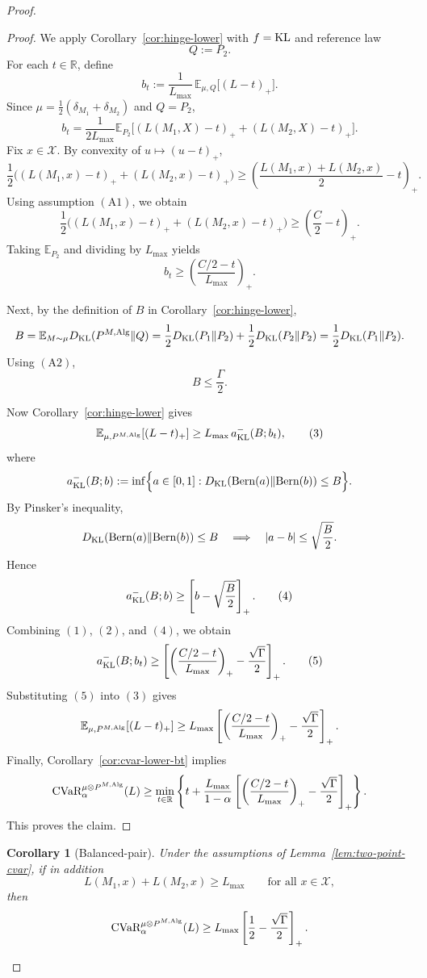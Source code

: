 \documentclass[conference]{IEEEtran}
\newtheorem{corollary}{Corollary}
\begin{document}
\begin{proof}[Proof]
\begin{proof}
We apply Corollary~\ref{cor:hinge-lower} with \(f=\textup{KL}\) and reference law
\[
Q:=P_2.
\]
For each \(t\in\mathbb{R}\), define
\[
b_t:=\frac{1}{L_{\max}}\,
\mathbb{E}_{\mu,Q}\big[(L-t)_+\big].
\]
Since \(\mu=\frac12(\delta_{M_1}+\delta_{M_2})\) and \(Q=P_2\),
\[
b_t
=
\frac{1}{2L_{\max}}
\mathbb{E}_{P_2}\big[(L(M_1,X)-t)_+ + (L(M_2,X)-t)_+\big].
\]
Fix \(x\in\mathcal{X}\). By convexity of \(u\mapsto (u-t)_+\),
\[
\frac12\Big((L(M_1,x)-t)_+ + (L(M_2,x)-t)_+\Big)
\ge
\left(\frac{L(M_1,x)+L(M_2,x)}{2}-t\right)_+.
\]
Using assumption \((\mathrm{A1})\), we obtain
\[
\frac12\Big((L(M_1,x)-t)_+ + (L(M_2,x)-t)_+\Big)
\ge
\left(\frac{C}{2}-t\right)_+.
\]
Taking \(\mathbb{E}_{P_2}\) and dividing by \(L_{\max}\) yields
\[
b_t\ge \left(\frac{C/2-t}{L_{\max}}\right)_+.
\tag{1}
\]

Next, by the definition of \(B\) in Corollary~\ref{cor:hinge-lower},
\[
B
=
\mathbb{E}_{M\sim\mu}D_{\textup{KL}}(P^{M,\textup{Alg}}\|Q)
=
\frac12D_{\textup{KL}}(P_1\|P_2)+\frac12D_{\textup{KL}}(P_2\|P_2)
=
\frac12D_{\textup{KL}}(P_1\|P_2).
\]
Using \((\mathrm{A2})\),
\[
B\le \frac{\Gamma}{2}.
\tag{2}
\]

Now Corollary~\ref{cor:hinge-lower} gives
\[
\mathbb{E}_{\mu,P^{M,\textup{Alg}}}[(L-t)_+]
\ge
L_{\max}\,a^{-}_{\textup{KL}}(B;b_t),
\tag{3}
\]
where
\[
a^{-}_{\textup{KL}}(B;b)
:=
\inf\Bigl\{a\in[0,1]:
D_{\textup{KL}}(\textup{Bern}(a)\|\textup{Bern}(b))\le B
\Bigr\}.
\]
By Pinsker's inequality,
\[
D_{\textup{KL}}(\textup{Bern}(a)\|\textup{Bern}(b))\le B
\quad\Longrightarrow\quad
|a-b|\le \sqrt{\frac{B}{2}}.
\]
Hence
\[
a^{-}_{\textup{KL}}(B;b)\ge \left[b-\sqrt{\frac{B}{2}}\right]_+.
\tag{4}
\]
Combining \((1)\), \((2)\), and \((4)\), we obtain
\[
a^{-}_{\textup{KL}}(B;b_t)
\ge
\left[
\left(\frac{C/2-t}{L_{\max}}\right)_+
-\frac{\sqrt{\Gamma}}{2}
\right]_+.
\tag{5}
\]
Substituting \((5)\) into \((3)\) gives
\[
\mathbb{E}_{\mu,P^{M,\textup{Alg}}}[(L-t)_+]
\ge
L_{\max}
\left[
\left(\frac{C/2-t}{L_{\max}}\right)_+
-\frac{\sqrt{\Gamma}}{2}
\right]_+.
\]
Finally, Corollary~\ref{cor:cvar-lower-bt} implies
\[
\textup{CVaR}_\alpha^{\mu\otimes P^{M,\textup{Alg}}}(L)
\ge
\min_{t\in\mathbb{R}}
\left\{
t+\frac{L_{\max}}{1-\alpha}
\left[
\left(\frac{C/2-t}{L_{\max}}\right)_+
-\frac{\sqrt{\Gamma}}{2}
\right]_+
\right\}.
\]
This proves the claim.
\end{proof}

\begin{corollary}[Balanced-pair]
\label{cor:balanced-two-point-cvar}
Under the assumptions of Lemma~\ref{lem:two-point-cvar}, if in addition
\[
L(M_1,x)+L(M_2,x)\ge L_{\max}
\qquad
\text{for all }x\in\mathcal{X},
\tag{A3}
\]
then
\[
\textup{CVaR}_\alpha^{\mu\otimes P^{M,\textup{Alg}}}(L)
\ge
L_{\max}\left[\frac12-\frac{\sqrt{\Gamma}}{2}\right]_+.
\]
\end{corollary}


\end{proof}
\end{document}
